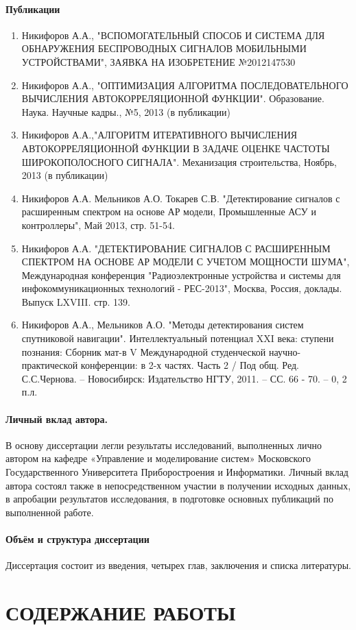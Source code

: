 \paragraph{Публикации}
\begin{enumerate}
	\item Никифоров А.А., "ВСПОМОГАТЕЛЬНЫЙ СПОСОБ И СИСТЕМА ДЛЯ ОБНАРУЖЕНИЯ БЕСПРОВОДНЫХ СИГНАЛОВ
	        МОБИЛЬНЫМИ УСТРОЙСТВАМИ", ЗАЯВКА НА ИЗОБРЕТЕНИЕ №2012147530
	\item Никифоров А.А., "ОПТИМИЗАЦИЯ АЛГОРИТМА ПОСЛЕДОВАТЕЛЬНОГО ВЫЧИСЛЕНИЯ АВТОКОРРЕЛЯЦИОННОЙ ФУНКЦИИ".
		Образование. Наука. Научные кадры., №5, 2013 (в публикации)
	\item Никифоров А.А.,"АЛГОРИТМ ИТЕРАТИВНОГО ВЫЧИСЛЕНИЯ АВТОКОРРЕЛЯЦИОННОЙ ФУНКЦИИ В ЗАДАЧЕ ОЦЕНКЕ ЧАСТОТЫ ШИРОКОПОЛОСНОГО СИГНАЛА".
		Механизация строительства, Ноябрь, 2013 (в публикации)
	\item Никифоров А.А. Мельников А.О. Токарев С.В. "Детектирование сигналов с расширенным спектром на основе АР модели, Промышленные АСУ и контроллеры", Май 2013, стр. 51-54.
	\item Никифоров А.А. "ДЕТЕКТИРОВАНИЕ СИГНАЛОВ С РАСШИРЕННЫМ СПЕКТРОМ НА ОСНОВЕ АР МОДЕЛИ С УЧЕТОМ МОЩНОСТИ ШУМА", Международная конференция
		"Радиоэлектронные устройства и системы для инфокоммуникационных технологий - РЕС-2013", Москва, Россия, доклады. Выпуск LXVIII. стр. 139.
	\item Никифоров А.А., Мельников А.О. "Методы детектирования систем спутниковой навигации". Интеллектуальный потенциал XXI века: ступени познания:
		Сборник мат-в V Международной студенческой научно-практической конференции: в 2-х частях. Часть 2 / Под общ. Ред. С.С.Чернова. – Новосибирск:
		Издательство НГТУ, 2011. – СС. 66 - 70. – 0, 2 п.л.
\end{enumerate}

\paragraph{Личный вклад автора.}
В основу диссертации легли результаты исследований, выполненных лично автором на кафедре «Управление и моделирование систем» Московского Государственного
Университета Приборостроения и Информатики. Личный вклад автора состоял также в непосредственном участии в получении исходных данных, в апробации результатов исследования,
в подготовке основных публикаций по выполненной работе.

\paragraph{Объём и структура диссертации}
Диссертация состоит из введения, четырех глав, заключения и списка литературы.

\section*{СОДЕРЖАНИЕ РАБОТЫ}





%




\newpage
